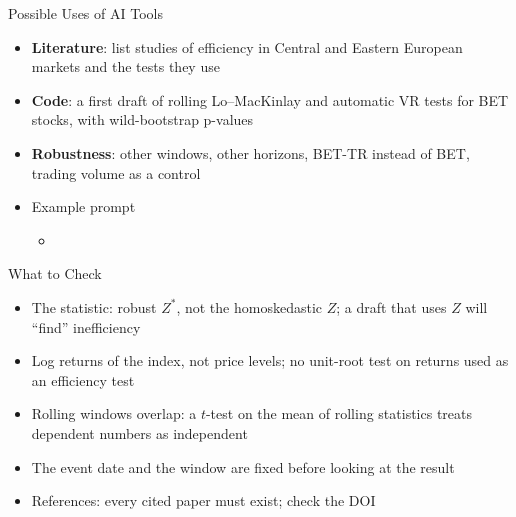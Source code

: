 \begin{frame}{Possible Uses of AI Tools}
\itemsize{\small}
\begin{itemize}
    \item \textbf{Literature}: list studies of efficiency in Central and Eastern European markets and the tests they use
    \item \textbf{Code}: a first draft of rolling Lo--MacKinlay and automatic VR tests for BET stocks, with wild-bootstrap p-values
    \item \textbf{Robustness}: other windows, other horizons, BET-TR instead of BET, trading volume as a control
    \item Example prompt
    \begin{itemize}
        \item {}
    \end{itemize}
\end{itemize}
\end{frame}

\begin{frame}{What to Check}
\itemsize{\small}
\begin{itemize}
    \item The statistic: robust $Z^*$, not the homoskedastic $Z$; a draft that uses $Z$ will ``find'' inefficiency
    \item Log returns of the index, not price levels; no unit-root test on returns used as an efficiency test
    \item Rolling windows overlap: a $t$-test on the mean of rolling statistics treats dependent numbers as independent
    \item The event date and the window are fixed before looking at the result
    \item References: every cited paper must exist; check the DOI
\end{itemize}
\end{frame}

